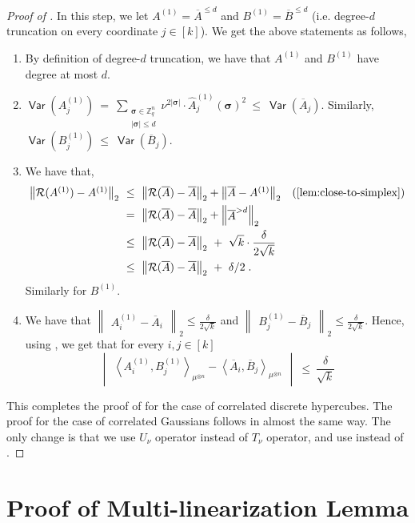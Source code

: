 \documentclass[11pt]{article}
\newcommand{\inangle}[1]{\left \langle #1 \right \rangle}
\newcommand{\inabs}[1]{\begin{vmatrix} #1 \end{vmatrix}}
\newcommand{\norm}[2]{\begin{Vmatrix} #2 \end{Vmatrix}_{#1}}
\DeclareMathOperator*{\Var}{\mathsf{Var}}
\newcommand{\what}[1]{\widehat{#1}}
\newcommand{\bbZ}{{\mathbb Z}}
\newcommand{\bsigma}{{\boldsymbol \sigma}}
\newcommand{\calR}{\mathcal{R}}
\begin{document}
\begin{proof}[Proof of ]
	\noindent In this step, we let $A^{(1)} = \overline{A}^{\le d}$ and $B^{(1)} = \overline{B}^{\le d}$ (i.e. degree-$d$ truncation on every coordinate $j \in [k]$). We get the above statements as follows,
	\begin{enumerate}
		\item By definition of degree-$d$ truncation, we have that $A^{(1)}$ and $B^{(1)}$ have degree at most $d$.
		\item $\Var(A^{(1)}_j) ~=~ \sum\limits_{\substack{\bsigma \in \bbZ_q^n \\ |\bsigma| \le d}} \nu^{2|\bsigma|} \cdot \what{A}_j^{(1)}(\bsigma)^2 ~\le~ \Var(\overline{A}_j)$. Similarly, $\Var(B^{(1)}_j) ~\le~ \Var(\overline{B}_j)$.
		\item We have that,
		\begin{align*}
		\norm{2}{\calR(A^{(1)}) - A^{(1)}}
		&~\le~ \norm{2}{\calR(\overline{A}) - \overline{A}} + \norm{2}{\overline{A} - A^{(1)}} && \text{(\Cref{lem:close-to-simplex})}\\
		&~=~ \norm{2}{\calR(\overline{A}) - \overline{A}} + \norm{2}{\overline{A}^{> d}}\\
		&~\le~ \norm{2}{\calR(\overline{A}) - \overline{A}} ~+~ \sqrt{k} \cdot \frac{\delta}{2\sqrt{k}}\\
		&~\le~ \norm{2}{\calR(\overline{A}) - \overline{A}} ~+~ \delta/2\;.
		\end{align*}
		Similarly for $B^{(1)}$.
		\item We have that $\norm{2}{A^{(1)}_i - \overline{A}_i}\le \frac{\delta}{2\sqrt{k}}$ and $\norm{2}{B^{(1)}_j - \overline{B}_j} \le \frac{\delta}{2\sqrt{k}}$. Hence, using , we get that for every $i, j \in [k]$
		\[\inabs{\inangle{A^{(1)}_i, B^{(1)}_j}_{\mu^{\otimes n}} - \inangle{\overline{A}_i, \overline{B}_j}_{\mu^{\otimes n}}} ~\le~ \frac{\delta}{\sqrt{k}}\]
	\end{enumerate}
	
	\noindent This completes the proof of  for the case of correlated discrete hypercubes. The proof for the case of correlated Gaussians follows in almost the same way. The only change is that we use $U_\nu$ operator instead of $T_\nu$ operator, and use  instead of .
\end{proof}%

\section{Proof of Multi-linearization Lemma} \label{apx:non-multilinear}
\end{document}
